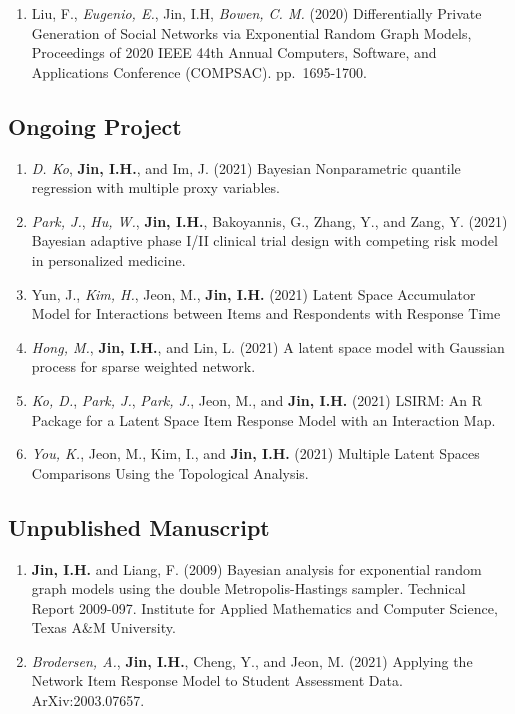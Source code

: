 \documentclass[
]{book}
\providecommand{\tightlist}{%
  \setlength{\itemsep}{0pt}\setlength{\parskip}{0pt}}
\begin{document}
\begin{enumerate}
\def\labelenumi{\arabic{enumi}.}
\tightlist
\item
  Liu, F., \emph{Eugenio, E.}, Jin, I.H, \emph{Bowen, C. M.} (2020) Differentially Private Generation of Social Networks via Exponential Random Graph Models, Proceedings of 2020 IEEE 44th Annual Computers, Software, and Applications Conference (COMPSAC). pp.~1695-1700.
\end{enumerate}

\hypertarget{ongoing-project}{%
\subsection*{Ongoing Project}\label{ongoing-project}}

\begin{enumerate}
\def\labelenumi{\arabic{enumi}.}
\item
  \emph{D. Ko}, \textbf{Jin, I.H.}, and Im, J. (2021) Bayesian Nonparametric quantile regression with multiple proxy variables.
\item
  \emph{Park, J.}, \emph{Hu, W.}, \textbf{Jin, I.H.}, Bakoyannis, G., Zhang, Y., and Zang, Y. (2021) Bayesian adaptive phase I/II clinical trial design with competing risk model in personalized medicine.
\item
  Yun, J., \emph{Kim, H.}, Jeon, M., \textbf{Jin, I.H.} (2021) Latent Space Accumulator Model for Interactions between Items and Respondents with Response Time
\item
  \emph{Hong, M.}, \textbf{Jin, I.H.}, and Lin, L. (2021) A latent space model with Gaussian process for sparse weighted network.
\item
  \emph{Ko, D.}, \emph{Park, J.}, \emph{Park, J.}, Jeon, M., and \textbf{Jin, I.H.} (2021) LSIRM: An R Package for a Latent Space Item Response Model with an Interaction Map.
\item
  \emph{You, K.}, Jeon, M., Kim, I., and \textbf{Jin, I.H.} (2021) Multiple Latent Spaces Comparisons Using the Topological Analysis.
\end{enumerate}

\hypertarget{unpublished-manuscript}{%
\subsection{Unpublished Manuscript}\label{unpublished-manuscript}}

\begin{enumerate}
\def\labelenumi{\arabic{enumi}.}
\item
  \textbf{Jin, I.H.} and Liang, F. (2009) Bayesian analysis for exponential random graph models using the double Metropolis-Hastings sampler. Technical Report 2009-097. Institute for Applied Mathematics and Computer Science, Texas A\&M University.
\item
  \emph{Brodersen, A.}, \textbf{Jin, I.H.}, Cheng, Y., and Jeon, M. (2021) Applying the Network Item Response Model to Student Assessment Data. ArXiv:2003.07657.
\end{enumerate}
\end{document}
